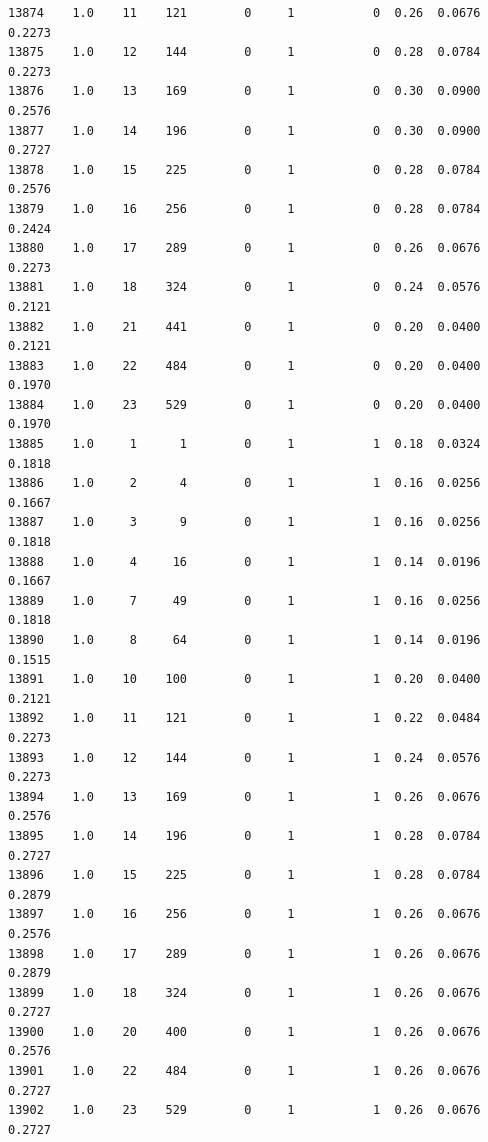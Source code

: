 \documentclass[11pt]{article}
\begin{document}
\begin{verbatim}
13874    1.0    11    121        0     1           0  0.26  0.0676  0.2273   
13875    1.0    12    144        0     1           0  0.28  0.0784  0.2273   
13876    1.0    13    169        0     1           0  0.30  0.0900  0.2576   
13877    1.0    14    196        0     1           0  0.30  0.0900  0.2727   
13878    1.0    15    225        0     1           0  0.28  0.0784  0.2576   
13879    1.0    16    256        0     1           0  0.28  0.0784  0.2424   
13880    1.0    17    289        0     1           0  0.26  0.0676  0.2273   
13881    1.0    18    324        0     1           0  0.24  0.0576  0.2121   
13882    1.0    21    441        0     1           0  0.20  0.0400  0.2121   
13883    1.0    22    484        0     1           0  0.20  0.0400  0.1970   
13884    1.0    23    529        0     1           0  0.20  0.0400  0.1970   
13885    1.0     1      1        0     1           1  0.18  0.0324  0.1818   
13886    1.0     2      4        0     1           1  0.16  0.0256  0.1667   
13887    1.0     3      9        0     1           1  0.16  0.0256  0.1818   
13888    1.0     4     16        0     1           1  0.14  0.0196  0.1667   
13889    1.0     7     49        0     1           1  0.16  0.0256  0.1818   
13890    1.0     8     64        0     1           1  0.14  0.0196  0.1515   
13891    1.0    10    100        0     1           1  0.20  0.0400  0.2121   
13892    1.0    11    121        0     1           1  0.22  0.0484  0.2273   
13893    1.0    12    144        0     1           1  0.24  0.0576  0.2273   
13894    1.0    13    169        0     1           1  0.26  0.0676  0.2576   
13895    1.0    14    196        0     1           1  0.28  0.0784  0.2727   
13896    1.0    15    225        0     1           1  0.28  0.0784  0.2879   
13897    1.0    16    256        0     1           1  0.26  0.0676  0.2576   
13898    1.0    17    289        0     1           1  0.26  0.0676  0.2879   
13899    1.0    18    324        0     1           1  0.26  0.0676  0.2727   
13900    1.0    20    400        0     1           1  0.26  0.0676  0.2576   
13901    1.0    22    484        0     1           1  0.26  0.0676  0.2727   
13902    1.0    23    529        0     1           1  0.26  0.0676  0.2727   


\end{verbatim}
\end{document}
